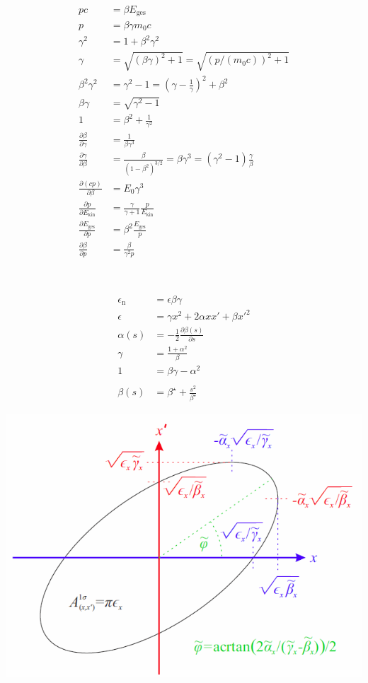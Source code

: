\documentclass[12pt]{scrreprt}%
\begin{document}
\begin{align*}
pc&=\beta E_{\text{ges}}\\
p&=\beta\gamma m_0 c\\
\gamma^2 &=1+\beta^2\gamma^2\\
\gamma &= \sqrt{(\beta\gamma)^2+1} = \sqrt{(p/(m_0 c))^2+1}\\
\beta^2\gamma^2 &=\gamma^2-1=\left(\gamma-\frac{1}{\gamma}\right)^2+\beta^2\\
\beta\gamma &=\sqrt{\gamma^2-1}\\
1 &=\beta^2+\frac{1}{\gamma^2}\\
\frac{\partial\beta}{\partial\gamma}&=\frac{1}{\beta\gamma^3}\\
\frac{\partial\gamma}{\partial\beta}&=\frac{\beta}{(1-\beta^2)^{3/2}}=\beta\gamma^3 =\left(\gamma^2-1\right)\frac{\gamma}{\beta}\\
\frac{\partial(cp)}{\partial\beta}&=E_0\gamma^3\\
\frac{\partial p}{\partial E_{\text{kin}}}&=\frac{\gamma}{\gamma+1}\frac{p}{E_{\text{kin}}}\\
\frac{\partial E_{\text{ges}}}{\partial p}&=\beta^2\frac{E_{\text{ges}}}{p}\\
\frac{\partial\beta}{\partial p}&=\frac{\beta}{\gamma^2p}
\end{align*}
 
 
 

~  \newpage 



\begin{align*}
\epsilon_\text{n}&=\epsilon\beta\gamma\\
\epsilon&=\gamma x^2+2\alpha xx'+\beta x'^2\\
\alpha(s)&=-\frac{1}{2}\frac{\partial\beta(s)}{\partial s}\\
\gamma&=\frac{1+\alpha^2}{\beta}\\
1&=\beta\gamma-\alpha^2\\
\\
\beta(s)&=\beta^\star+\frac{s^2}{\beta^\star}
\end{align*}

\includegraphics[scale=0.8]{phasenraum_ellipse.png}
\end{document}
